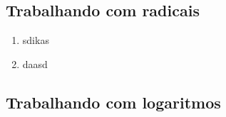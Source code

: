 \documentclass[a4paper, 11pt]{article}
\begin{document}
    \begin{center}
        \section*{Trabalhando com radicais}
    \end{center}

    \begin{enumerate}
        \item sdikas
        \item daasd
    \end{enumerate}

    \begin{center}
        \section*{Trabalhando com logaritmos}
    \end{center}
\end{document}
